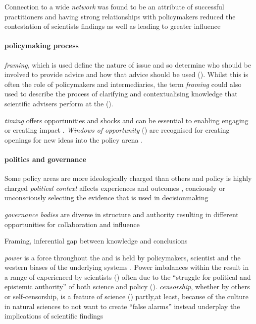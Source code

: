 Connection to a wide \emph{network} was found to be an attribute of successful \SPI{} practitioners \cite{GogginEtAl2015} and having strong relationships with policymakers reduced the contestation of scientists findings \cite{OjanenBKP2021} as well as leading to greater influence \cite{SaxonbergSL2023} 


\paragraph{policymaking process}
\emph{framing}, which is used define the nature of issue and so determine who should be involved to provide advice and how that advice should be used (\cite{OECD2015,MoallemiZHSMZHKHMGLB2023}). Whilst this is often the role of policymakers and intermediaries, the term \emph{framing} could also used to describe the process of clarifying and contextualising knowledge that scientific advisers perform at the \SPI{} (\cite{Gerber2023,ThompsonD2024}).

\emph{timing} offers opportunities and shocks \cite{CairneyW2017} and can be essential to enabling engaging or creating impact \cite{GluckmanBK2021}. \emph{Windows of opportunity} (\cite{Kingdon1993}) are recognised for creating openings for new ideas into the policy arena \cite{RoseBOP2018}. 


\paragraph{politics and governance}
Some policy areas are more ideologically charged than others \cite{WesselinkH2020,SaxonbergSL2023} and \CAN policy is highly charged
\emph{political context} affects experiences and outcomes \cite{SaxonbergSL2023}, conciously or unconsciously selecting the evidence that is used in decisionmaking \cite{StrassheimK2014}

\emph{governance bodies} are diverse in structure and authority \cite{CairneyW2017} resulting in different opportunities for collaboration and influence \cite{GeuijenMCRv2017,OjanenBKP2021}


Framing, inferential gap between knowledge and conclusions \cite{GluckmanBK2021}


\emph{power} is a force throughout the \SPI{} and is held by policymakers, scientist and the western biases of the underlying systems \cite{TurnhoutMWKL2020}. Power imbalances within the \SPI{} result in a range of experienced by scientists (\cite{OjanenBKP2021}) often due to the ``struggle for political and epistemic authority'' of both science and policy (\cite{StrassheimK2014}). 
\emph{censorship}, whether by others \cite{OjanenBKP2021} or self-censorship, is a feature of science  (\cite{ValiverronenS2021,Pearce2024}) partly,at least, because of the culture in natural sciences to not want to create ``false alarms'' \cite{ReadO2017,PoeS2023} instead underplay the implications of \CAN{} scientific findings \cite{CalverleyA2022}



